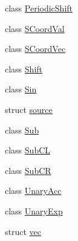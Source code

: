 \begin{DoxyCompactItemize}
class \hyperlink{classshark_1_1ndim_1_1_periodic_shift}{Periodic\+Shift}
\item 
class \hyperlink{classshark_1_1ndim_1_1_s_coord_val}{S\+Coord\+Val}
\item 
class \hyperlink{classshark_1_1ndim_1_1_s_coord_vec}{S\+Coord\+Vec}
\item 
class \hyperlink{classshark_1_1ndim_1_1_shift}{Shift}
\item 
class \hyperlink{classshark_1_1ndim_1_1_sin}{Sin}
\item 
struct \hyperlink{structshark_1_1ndim_1_1source}{source}
\item 
class \hyperlink{classshark_1_1ndim_1_1_sub}{Sub}
\item 
class \hyperlink{classshark_1_1ndim_1_1_sub_c_l}{Sub\+CL}
\item 
class \hyperlink{classshark_1_1ndim_1_1_sub_c_r}{Sub\+CR}
\item 
class \hyperlink{classshark_1_1ndim_1_1_unary_acc}{Unary\+Acc}
\item 
class \hyperlink{classshark_1_1ndim_1_1_unary_exp}{Unary\+Exp}
\item 
struct \hyperlink{structshark_1_1ndim_1_1vec}{vec}
\end{DoxyCompactItemize}
